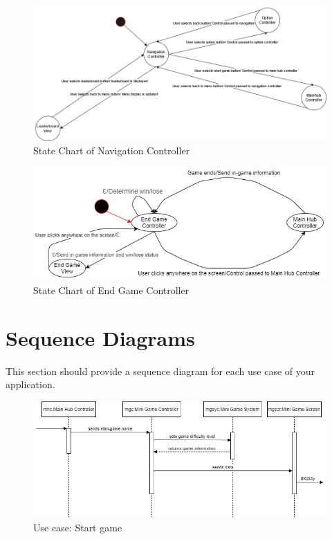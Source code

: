 \documentclass[]{article}
\begin{document}
\begin{figure}[H]
    \centering
    \includegraphics[width=\textwidth]{D3/stateCharts/statediagramnav.png}
    \caption{State Chart of Navigation Controller}
\end{figure}

\begin{figure}[H]
    \centering
    \includegraphics[width=\textwidth]{D3/stateCharts/end_game_state_chart.jpg}
    \caption{State Chart of End Game Controller}
\end{figure}

\newpage
\section{Sequence Diagrams}
\label{sec:sequence_diagrams}
This section should provide a sequence diagram for each use case of your application.

\begin{figure}[H]
    \centering
    \includegraphics[width=\textwidth]{sequenceDiagrams/start_game.png}
    \caption{Use case: Start game}
    \label{fig:seq_start_game}
\end{figure}
\end{document}
